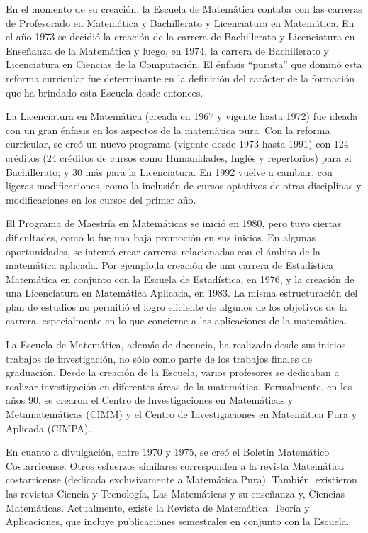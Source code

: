 En el momento de su creación, la Escuela de Matemática contaba con las carreras de Profesorado en Matemática y Bachillerato y Licenciatura en Matemática. En el año 1973 se decidió la creación de la carrera de Bachillerato y Licenciatura en Enseñanza de la Matemática y luego, en 1974, la carrera de Bachillerato y Licenciatura en Ciencias de la Computación. El énfasis “purista” que dominó esta reforma curricular fue determinante en la definición del carácter de la formación que ha brindado esta Escuela desde entonces. 

La Licenciatura en Matemática (creada en 1967 y vigente hasta 1972) fue ideada con un gran énfasis en los aspectos de la matemática pura. Con la reforma curricular, se creó un nuevo programa (vigente desde 1973 hasta 1991) con 124 créditos (24 créditos de cursos como Humanidades, Inglés y repertorios) para el Bachillerato; y 30 más para la Licenciatura. En 1992 vuelve a cambiar, con ligeras modificaciones, como la inclusión de cursos optativos de otras disciplinas y modificaciones en los cursos del primer año. 

El Programa de Maestría en Matemáticas se inició en 1980, pero tuvo ciertas dificultades, como lo fue una baja promoción en sus inicios. En algunas oportunidades, se intentó crear carreras relacionadas con el ámbito de la matemática aplicada. Por ejemplo,la creación de una carrera de Estadística Matemática en conjunto con la Escuela de Estadística, en 1976, y la creación de una Licenciatura en Matemática Aplicada, en 1983. La misma estructuración del plan de estudios no permitió el logro eficiente de algunos de los objetivos de la carrera, especialmente en lo que concierne a las aplicaciones de la matemática. 

La Escuela de Matemática, además de docencia, ha realizado desde sus inicios trabajos de investigación, no sólo como parte de los trabajos finales de graduación. Desde la creación de la Escuela, varios profesores se dedicaban a realizar investigación en diferentes áreas de la matemática. Formalmente, en los años 90, se crearon el Centro de Investigaciones en Matemáticas y Metamatemáticas (CIMM) y el Centro de Investigaciones en Matemática Pura y Aplicada (CIMPA). 

En cuanto a divulgación, entre 1970 y 1975, se creó el Boletín Matemático Costarricense. Otros esfuerzos similares corresponden a la revista Matemática costarricense (dedicada exclusivamente a Matemática Pura). También, existieron las revistas Ciencia y Tecnología, Las Matemáticas y su enseñanza y, Ciencias Matemáticas. Actualmente, existe la Revista de Matemática: Teoría y Aplicaciones, que incluye publicaciones semestrales en conjunto con la Escuela.


